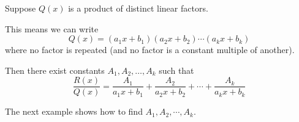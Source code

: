 \begin{frame}
Suppose $Q(x)$ is a product of distinct linear factors.

This means we can write
\[
Q(x) = (a_1x+b_1)(a_2x+b_2) \cdots (a_kx+b_k)
\]
where no factor is repeated (and no factor is a constant multiple of another).

Then there exist constants $A_1, A_2, \ldots , A_k$ such that
\[
\frac{R(x)}{Q(x)} = \frac{A_1}{a_1x+b_1} + \frac{A_2}{a_2x+b_2} + \cdots + \frac{A_k}{a_kx+b_k}
\]

The next example shows how to find $A_1, A_2, \cdots , A_k$.
\end{frame}
